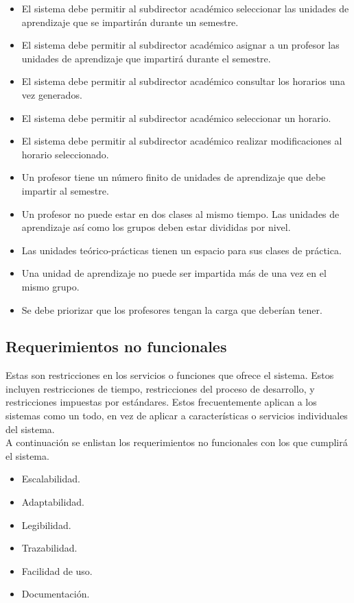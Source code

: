 	\begin{itemize}
		\item El sistema debe permitir al subdirector académico seleccionar las unidades de aprendizaje que se impartirán durante un semestre.
		
		\item El sistema debe permitir al subdirector académico asignar a un profesor las unidades de aprendizaje que impartirá durante el semestre.
		
		\item El sistema debe permitir al subdirector académico consultar los horarios una vez generados.
		
		\item El sistema debe permitir al subdirector académico seleccionar un horario.
		
		\item El sistema debe permitir al subdirector académico realizar modificaciones al horario seleccionado.
		
		\item Un profesor tiene un número finito de unidades de aprendizaje que debe impartir al semestre.
		
		\item Un profesor no puede estar en dos clases al mismo tiempo.
		Las unidades de aprendizaje así como los grupos deben estar divididas por nivel.
		
		\item Las unidades teórico-prácticas tienen un espacio para sus clases de práctica.
		
		\item Una unidad de aprendizaje no puede ser impartida más de una vez en el mismo grupo.
		
		\item Se debe priorizar que los profesores tengan la carga que deberían tener.
		
	\end{itemize}
	

\subsection{Requerimientos no funcionales}
	
	Estas son restricciones en los servicios o funciones que ofrece el sistema. Estos incluyen restricciones de tiempo, restricciones del proceso de desarrollo, y restricciones impuestas por estándares. Estos frecuentemente aplican a los sistemas como un todo, en vez de aplicar a características o servicios individuales del sistema. \\
	
	A continuación se enlistan los requerimientos no funcionales con los que cumplirá el sistema.

	\begin{itemize}
		\item Escalabilidad.
		
		\item Adaptabilidad.
		
		\item Legibilidad.
		
		\item Trazabilidad.
		
		\item Facilidad de uso.
		
		\item Documentación.
		
	\end{itemize}